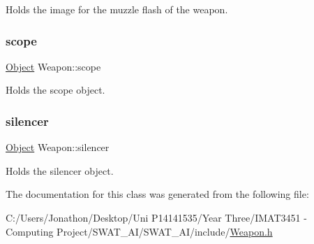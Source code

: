 Holds the image for the muzzle flash of the weapon. 

\mbox{\label{class_weapon_aac79adb9764ea4f9b009d93d85acebad}} 
\subsubsection{\texorpdfstring{scope}{scope}}
{\footnotesize\ttfamily \hyperlink{class_object}{Object} Weapon\+::scope\hspace{0.3cm}{\ttfamily [private]}}



Holds the scope object. 

\mbox{\label{class_weapon_a78d092409afe65e44563870eef37d158}} 
\subsubsection{\texorpdfstring{silencer}{silencer}}
{\footnotesize\ttfamily \hyperlink{class_object}{Object} Weapon\+::silencer\hspace{0.3cm}{\ttfamily [private]}}



Holds the silencer object. 



The documentation for this class was generated from the following file\+:\begin{DoxyCompactItemize}
\item 
C\+:/\+Users/\+Jonathon/\+Desktop/\+Uni P14141535/\+Year Three/\+I\+M\+A\+T3451 -\/ Computing Project/\+S\+W\+A\+T\+\_\+\+A\+I/\+S\+W\+A\+T\+\_\+\+A\+I/include/\hyperlink{_weapon_8h}{Weapon.\+h}\end{DoxyCompactItemize}
